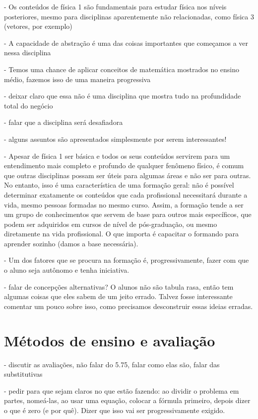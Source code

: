- Os conteúdos de física 1 são fundamentais para estudar física nos níveis posteriores, mesmo para disciplinas aparentemente não relacionadas, como física 3 (vetores, por exemplo)

- A capacidade de abstração é uma das coisas importantes que começamos a ver nessa disciplina

- Temos uma chance de aplicar conceitos de matemática mostrados no ensino médio, fazemos isso de uma maneira progressiva

- deixar claro que essa não é uma disciplina que mostra tudo na profundidade total do negócio

- falar que a disciplina será desafiadora

- alguns assuntos são apresentados simplesmente por serem interessantes!

- Apesar de física 1 ser básica e todos os seus conteúdos servirem para um entendimento mais completo e profundo de qualquer fenômeno físico, é comum que outras disciplinas possam ser úteis para algumas áreas e não ser para outras. No entanto, isso é uma característica de uma formação geral: não é possível determinar exatamente os conteúdos que cada profissional necessitará durante a vida, mesmo pessoas formadas no mesmo curso. Assim, a formação tende a ser um grupo de conhecimentos que servem de base para outros mais específicos, que podem ser adquiridos em cursos de nível de pós-graduação, ou mesmo diretamente na vida profissional. O que importa é capacitar o formando para aprender sozinho (damos a base necessária).

- Um dos fatores que se procura na formação é, progressivamente, fazer com que o aluno seja autônomo e tenha iniciativa.

- falar de concepções alternativas? O alunos não são tabula rasa, então tem algumas coisas que eles sabem de um jeito errado. Talvez fosse interessante comentar um pouco sobre isso, como precisamos desconstruir essas ideias erradas.

\section{Métodos de ensino e avaliação}

- discutir as avaliações, não falar do 5.75, falar como elas são, falar das substitutivas

- pedir para que sejam claros no que estão fazendo: ao dividir o problema em partes, nomeá-las, ao usar uma equação, colocar a fórmula primeiro, depois dizer o que é zero (e por quê). Dizer que isso vai ser progressivamente exigido.

